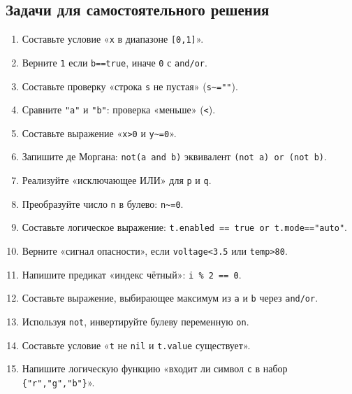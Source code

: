 \subsection*{Задачи для самостоятельного решения}
\begin{enumerate}
  \item Составьте условие «\verb|x| в диапазоне \verb|[0,1]|».
  \item Верните \verb|1| если \verb|b==true|, иначе \verb|0| с \verb|and/or|.
  \item Составьте проверку «строка \verb|s| не пустая» (\verb|s~=""|).
  \item Сравните \verb|"a"| и \verb|"b"|: проверка «меньше» (\verb|<|).
  \item Составьте выражение «\verb|x>0| и \verb|y~=0|».
  \item Запишите де Моргана: \verb|not(a and b)| эквивалент \verb|(not a) or (not b)|.
  \item Реализуйте «исключающее ИЛИ» для \verb|p| и \verb|q|.
  \item Преобразуйте число \verb|n| в булево: \verb|n~=0|.
  \item Составьте логическое выражение: \verb|t.enabled == true or t.mode=="auto"|.
  \item Верните «сигнал опасности», если \verb|voltage<3.5| или \verb|temp>80|.
  \item Напишите предикат «индекс чётный»: \verb|i % 2 == 0|.
  \item Составьте выражение, выбирающее максимум из \verb|a| и \verb|b| через \verb|and/or|.
  \item Используя \verb|not|, инвертируйте булеву переменную \verb|on|.
  \item Составьте условие «\verb|t| не \verb|nil| и \verb|t.value| существует».
  \item Напишите логическую функцию «входит ли символ \verb|c| в набор \verb|{"r","g","b"}|».
\end{enumerate}
